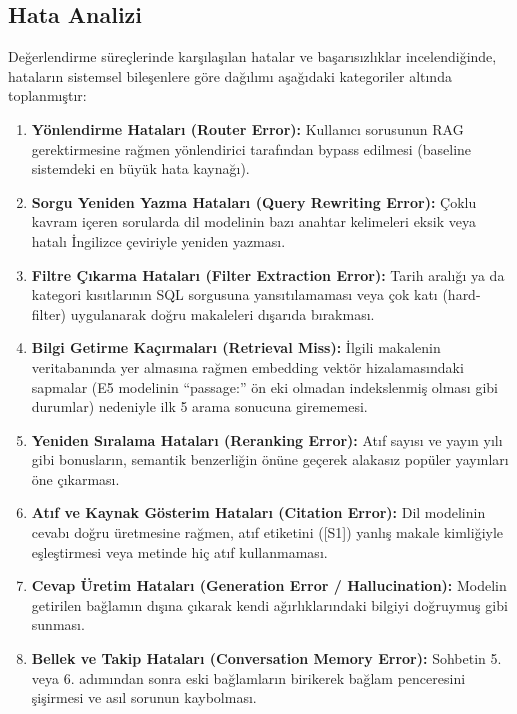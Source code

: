 \subsection{Hata Analizi}
Değerlendirme süreçlerinde karşılaşılan hatalar ve başarısızlıklar incelendiğinde, hataların sistemsel bileşenlere göre dağılımı aşağıdaki kategoriler altında toplanmıştır:
\begin{enumerate}
    \item \textbf{Yönlendirme Hataları (Router Error):} Kullanıcı sorusunun RAG gerektirmesine rağmen yönlendirici tarafından bypass edilmesi (baseline sistemdeki en büyük hata kaynağı).
    \item \textbf{Sorgu Yeniden Yazma Hataları (Query Rewriting Error):} Çoklu kavram içeren sorularda dil modelinin bazı anahtar kelimeleri eksik veya hatalı İngilizce çeviriyle yeniden yazması.
    \item \textbf{Filtre Çıkarma Hataları (Filter Extraction Error):} Tarih aralığı ya da kategori kısıtlarının SQL sorgusuna yansıtılamaması veya çok katı (hard-filter) uygulanarak doğru makaleleri dışarıda bırakması.
    \item \textbf{Bilgi Getirme Kaçırmaları (Retrieval Miss):} İlgili makalenin veritabanında yer almasına rağmen embedding vektör hizalamasındaki sapmalar (E5 modelinin ``passage:'' ön eki olmadan indekslenmiş olması gibi durumlar) nedeniyle ilk 5 arama sonucuna girememesi.
    \item \textbf{Yeniden Sıralama Hataları (Reranking Error):} Atıf sayısı ve yayın yılı gibi bonusların, semantik benzerliğin önüne geçerek alakasız popüler yayınları öne çıkarması.
    \item \textbf{Atıf ve Kaynak Gösterim Hataları (Citation Error):} Dil modelinin cevabı doğru üretmesine rağmen, atıf etiketini ([S1]) yanlış makale kimliğiyle eşleştirmesi veya metinde hiç atıf kullanmaması.
    \item \textbf{Cevap Üretim Hataları (Generation Error / Hallucination):} Modelin getirilen bağlamın dışına çıkarak kendi ağırlıklarındaki bilgiyi doğruymuş gibi sunması.
    \item \textbf{Bellek ve Takip Hataları (Conversation Memory Error):} Sohbetin 5. veya 6. adımından sonra eski bağlamların birikerek bağlam penceresini şişirmesi ve asıl sorunun kaybolması.
\end{enumerate}

